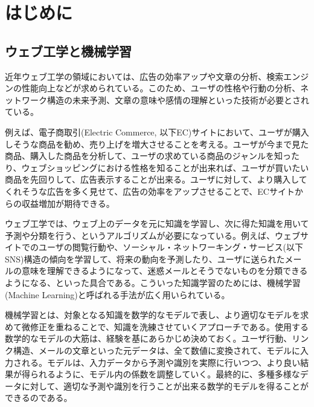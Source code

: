 \chapter{はじめに}
\label{chap:preface}
\section{ウェブ工学と機械学習}
近年ウェブ工学の領域においては、広告の効率アップや文章の分析、検索エンジンの性能向上などが求められている。このため、ユーザの性格や行動の分析、ネットワーク構造の未来予測、文章の意味や感情の理解といった技術が必要とされている。\par
例えば、電子商取引(Electric Commerce, 以下EC)サイトにおいて、ユーザが購入しそうな商品を勧め、売り上げを増大させることを考える。ユーザが今まで見た商品、購入した商品を分析して、ユーザの求めている商品のジャンルを知ったり、ウェブショッピングにおける性格を知ることが出来れば、ユーザが買いたい商品を先回りして、広告表示することが出来る。ユーザに対して、より購入してくれそうな広告を多く見せて、広告の効率をアップさせることで、ECサイトからの収益増加が期待できる。\par
ウェブ工学では、ウェブ上のデータを元に知識を学習し、次に得た知識を用いて予測や分類を行う、というアルゴリズムが必要になっている。例えば、ウェブサイトでのユーザの閲覧行動や、ソーシャル・ネットワーキング・サービス(以下SNS)構造の傾向を学習して、将来の動向を予測したり、ユーザに送られたメールの意味を理解できるようになって、迷惑メールとそうでないものを分類できるようになる、といった具合である。こういった知識学習のためには、機械学習(Machine Learning)と呼ばれる手法が広く用いられている。\par
機械学習とは、対象となる知識を数学的なモデルで表し、より適切なモデルを求めて微修正を重ねることで、知識を洗練させていくアプローチである。使用する数学的なモデルの大筋は、経験を基にあらかじめ決めておく。ユーザ行動、リンク構造、メールの文章といった元データは、全て数値に変換されて、モデルに入力される。モデルは、入力データから予測や識別を実際に行いつつ、より良い結果が得られるように、モデル内の係数を調整していく。最終的に、多種多様なデータに対して、適切な予測や識別を行うことが出来る数学的モデルを得ることができるのである。

